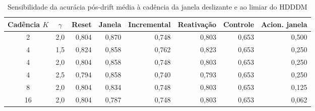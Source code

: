 \begin{table}[htbp]
\centering
\small
\caption{Sensibilidade da acurácia pós-drift média à cadência da janela deslizante e ao limiar do HDDDM}
\label{tab:sensibilidade}
\begin{adjustbox}{max width=\textwidth}
\begin{tabular}{ccrrrrrr}
\toprule
Cadência $K$ & $\gamma$ & Reset & Janela & Incremental & Reativação & Controle & Acion. janela \\
\midrule
2 & 2,0 & 0,804 & 0,870 & 0,748 & 0,803 & 0,653 & 0,500 \\
4 & 1,5 & 0,824 & 0,858 & 0,762 & 0,823 & 0,653 & 0,250 \\
4 & 2,0 & 0,804 & 0,858 & 0,748 & 0,803 & 0,653 & 0,250 \\
4 & 2,5 & 0,794 & 0,858 & 0,740 & 0,793 & 0,653 & 0,250 \\
8 & 2,0 & 0,804 & 0,834 & 0,748 & 0,803 & 0,653 & 0,125 \\
16 & 2,0 & 0,804 & 0,787 & 0,748 & 0,803 & 0,653 & 0,062 \\
\bottomrule
\end{tabular}
\end{adjustbox}
\par\vspace{2pt}{\footnotesize 5 repetições por condição; configuração principal: $K$ = 4, $\gamma$ = 2,0.}
\end{table}
